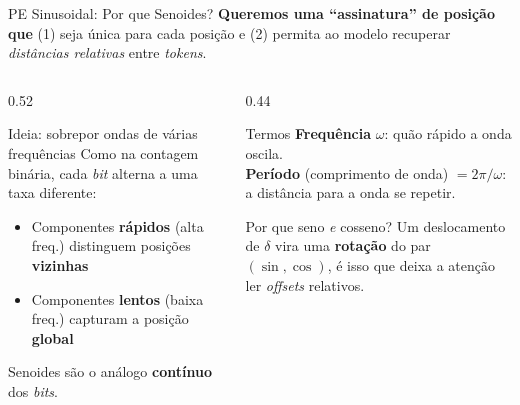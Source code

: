 \documentclass[aspectratio=169, xcolor=dvipsnames]{beamer}
\begin{document}
  \begin{frame}{PE Sinusoidal: Por que Senoides?}
    \textbf{Queremos uma ``assinatura'' de posição que} (1) seja única para cada posição e (2) permita ao modelo recuperar \textit{distâncias relativas} entre \textit{tokens}.

    \vspace{0.4em}
    \begin{columns}[T]
      \begin{column}{0.52\textwidth}
        \begin{block}{Ideia: sobrepor ondas de várias frequências}
          Como na contagem binária, cada \textit{bit} alterna a uma taxa diferente:
          \begin{itemize}
            \item Componentes \textbf{rápidos} (alta freq.) distinguem posições \textbf{vizinhas}
            \item Componentes \textbf{lentos} (baixa freq.) capturam a posição \textbf{global}
          \end{itemize}
          Senoides são o análogo \textbf{contínuo} dos \textit{bits}.
        \end{block}
      \end{column}
      \begin{column}{0.44\textwidth}
        \begin{exampleblock}{Termos}
          \textbf{Frequência} $\omega$: quão rápido a onda oscila.\\[2pt]
          \textbf{Período} (comprimento de onda) $=2\pi/\omega$: a distância para a onda se repetir.
        \end{exampleblock}
        \vspace{0.2em}
        {\small Por que seno \emph{e} cosseno? Um deslocamento de $\delta$ vira uma \textbf{rotação} do par $(\sin,\cos)$, é isso que deixa a atenção ler \textit{offsets} relativos.}
      \end{column}
    \end{columns}
  \end{frame}
\end{document}
